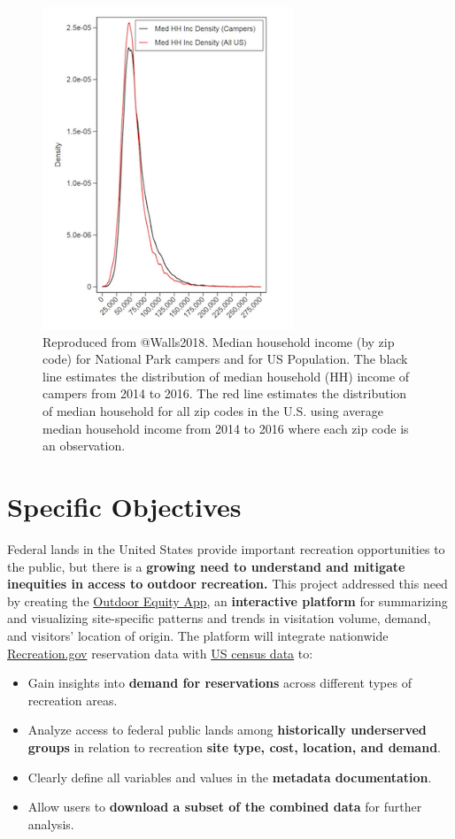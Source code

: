 \documentclass[
]{book}
\providecommand{\tightlist}{%
  \setlength{\itemsep}{0pt}\setlength{\parskip}{0pt}}
\begin{document}
\begin{figure}
\includegraphics[width=2.95in]{images/problem_statement_figure_4} \caption{Reproduced from @Walls2018. Median household income (by zip code) for National Park campers and for US Population. The black line estimates the distribution of median household (HH) income of campers from 2014 to 2016. The red line estimates the distribution of median household for all zip codes in the U.S. using average median household income from 2014 to 2016 where each zip code is an observation.}\label{fig:fig4}
\end{figure}

\hypertarget{specific-objectives}{%
\chapter{Specific Objectives}\label{specific-objectives}}

Federal lands in the United States provide important recreation opportunities to the public, but there is a \textbf{growing need to understand and mitigate inequities in access to outdoor recreation.} This project addressed this need by creating the \href{https://shinyapps.bren.ucsb.edu/oe_app/}{Outdoor Equity App}, an \textbf{interactive platform} for summarizing and visualizing site-specific patterns and trends in visitation volume, demand, and visitors' location of origin. The platform will integrate nationwide \href{https://www.recreation.gov/}{Recreation.gov} reservation data with \href{https://www.census.gov/data.html}{US census data} to:

\begin{itemize}
\tightlist
\item
  Gain insights into \textbf{demand for reservations} across different types of recreation areas.
\item
  Analyze access to federal public lands among \textbf{historically underserved groups} in
  relation to recreation \textbf{site type, cost, location, and demand}.
\item
  Clearly define all variables and values in the \textbf{metadata documentation}.
\item
  Allow users to \textbf{download a subset of the combined data} for further analysis.
\end{itemize}
\end{document}
